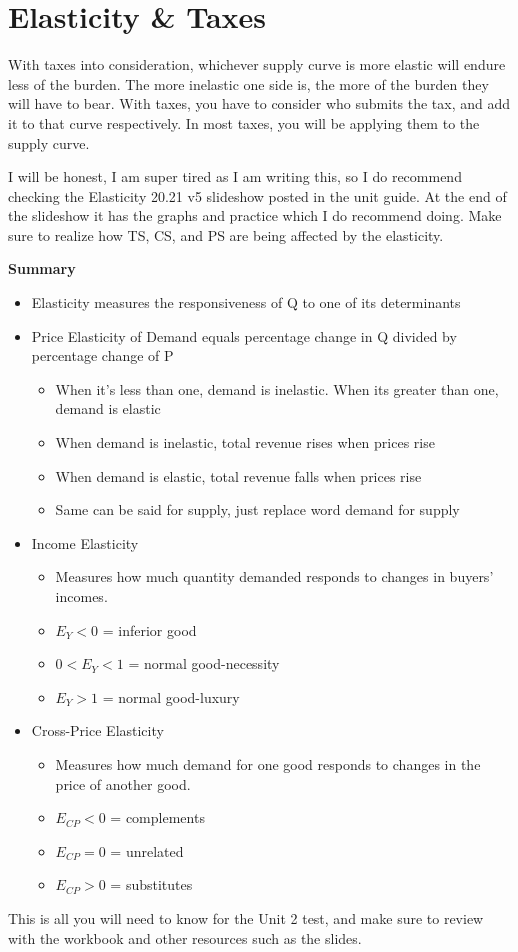 \section{Elasticity \& Taxes}
With taxes into consideration, whichever supply curve is more elastic will endure less of the burden. The more inelastic one side is, the more of the burden they will have to bear. With taxes, you have to consider who submits the tax, and add it to that curve respectively. In most taxes, you will be applying them to the supply curve. 

I will be honest, I am super tired as I am writing this, so I do recommend checking the Elasticity 20.21 v5 slideshow posted in the unit guide. At the end of the slideshow it has the graphs and practice which I do recommend doing. Make sure to realize how TS, CS, and PS are being affected by the elasticity. 

\textbf{Summary}
\begin{itemize}
    \item Elasticity measures the responsiveness of Q to one of its determinants
    \item Price Elasticity of Demand equals percentage change in Q divided by percentage change of P
        \begin{itemize}
            \item When it's less than one, demand is inelastic. When its greater than one, demand is elastic
            \item When demand is inelastic, total revenue rises when prices rise
            \item When demand is elastic, total revenue falls when prices rise
            \item Same can be said for supply, just replace word demand for supply
        \end{itemize}
    \item Income Elasticity
        \begin{itemize}
            \item Measures how much quantity demanded responds to changes in buyers' incomes. 
            \item $E_Y < 0$ = inferior good
            \item  $0 < E_Y < 1$ = normal good-necessity
            \item  $E_Y > 1$ = normal good-luxury
        \end{itemize}
    \item Cross-Price Elasticity
        \begin{itemize}
            \item Measures how much demand for one good responds to changes in the price of another good.
            \item $E_{CP} < 0$ = complements
            \item  $E_{CP} = 0$ = unrelated
            \item $E_{CP} > 0$ = substitutes
        \end{itemize}
\end{itemize}

This is all you will need to know for the Unit 2 test, and make sure to review with the workbook and other resources such as the slides. 
